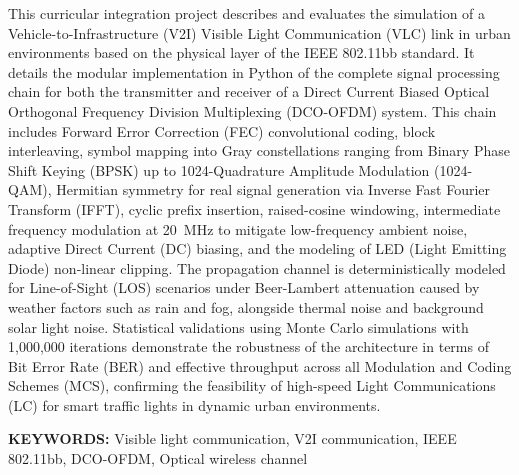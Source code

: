 \noindent This curricular integration project describes and evaluates the simulation of a Vehicle-to-Infrastructure (V2I) Visible Light Communication (VLC) link in urban environments based on the physical layer of the IEEE 802.11bb standard. It details the modular implementation in Python of the complete signal processing chain for both the transmitter and receiver of a Direct Current Biased Optical Orthogonal Frequency Division Multiplexing (DCO-OFDM) system. This chain includes Forward Error Correction (FEC) convolutional coding, block interleaving, symbol mapping into Gray constellations ranging from Binary Phase Shift Keying (BPSK) up to 1024-Quadrature Amplitude Modulation (1024-QAM), Hermitian symmetry for real signal generation via Inverse Fast Fourier Transform (IFFT), cyclic prefix insertion, raised-cosine windowing, intermediate frequency modulation at 20~MHz to mitigate low-frequency ambient noise, adaptive Direct Current (DC) biasing, and the modeling of LED (Light Emitting Diode) non-linear clipping. The propagation channel is deterministically modeled for Line-of-Sight (LOS) scenarios under Beer-Lambert attenuation caused by weather factors such as rain and fog, alongside thermal noise and background solar light noise. Statistical validations using Monte Carlo simulations with 1,000,000 iterations demonstrate the robustness of the architecture in terms of Bit Error Rate (BER) and effective throughput across all Modulation and Coding Schemes (MCS), confirming the feasibility of high-speed Light Communications (LC) for smart traffic lights in dynamic urban environments.

\vspace{1.0cm}
\noindent \textbf{KEYWORDS:} Visible light communication, V2I communication, IEEE 802.11bb, DCO-OFDM, Optical wireless channel
